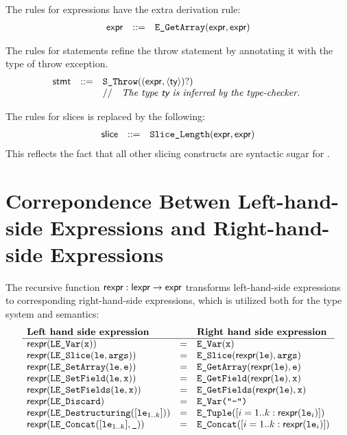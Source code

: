 \documentclass{book}
\begin{document}
The rules for expressions have the extra derivation rule:
\[
\begin{array}{rcl}
\textsf{expr} &::=& \texttt{E\_GetArray}(\textsf{expr}, \textsf{expr}) \\
\end{array}
\]

The rules for statements refine the throw statement by annotating it with
the type of throw exception.
\[
\begin{array}{rcl}
\textsf{stmt} &::=& \texttt{S\_Throw}((\textsf{expr}, \langle\textsf{ty}\rangle)?)\\
      & & //\quad\textit{The type $\textsf{ty}$ is inferred by the type-checker.}\ 
\end{array}
\]

The rules for slices is replaced by the following:
\[
\begin{array}{rcl}
\textsf{slice} &::=& \texttt{Slice\_Length}(\textsf{expr}, \textsf{expr}) \\
\end{array}
\]
This reflects the fact that all other slicing constructs are syntactic sugar
for \slicelength.

\chapter{Correpondence Betwen Left-hand-side Expressions and Right-hand-side Expressions
\label{ch:LeftToRight}}

The recursive function $\textsf{rexpr} : \textsf{lexpr} \rightarrow \textsf{expr}$ transforms
left-hand-side expressions to corresponding right-hand-side expressions,
which is utilized both for the type system and semantics:
\[
\begin{array}{lcl}
  \textbf{Left hand side expression} & & \textbf{Right hand side expression}\\
  \hline
  \textsf{rexpr}(\texttt{LE\_Var}(\texttt{x})) &=& \texttt{E\_Var}(\texttt{x})\\
  \textsf{rexpr}(\texttt{LE\_Slice}(\texttt{le}, \texttt{args})) &=& \texttt{E\_Slice}(\textsf{rexpr}(\texttt{le}), \texttt{args})\\
  \textsf{rexpr}(\texttt{LE\_SetArray}(\texttt{le}, \texttt{e})) &=& \texttt{E\_GetArray}(\textsf{rexpr}(\texttt{le}), \texttt{e})\\
  \textsf{rexpr}(\texttt{LE\_SetField}(\texttt{le}, \texttt{x})) &=& \texttt{E\_GetField}(\textsf{rexpr}(\texttt{le}), \texttt{x})\\
  \textsf{rexpr}(\texttt{LE\_SetFields}(\texttt{le}, \texttt{x})) &=& \texttt{E\_GetFields}(\textsf{rexpr}(\texttt{le}), \texttt{x})\\
  \textsf{rexpr}(\texttt{LE\_Discard}) &=& \texttt{E\_Var("-")}\\
  \textsf{rexpr}(\texttt{LE\_Destructuring}([\texttt{le}_{1..k}])) &=& \texttt{E\_Tuple}([i=1..k: \textsf{rexpr}(\texttt{le}_i)])\\
  \textsf{rexpr}(\texttt{LE\_Concat}([\texttt{le}_{1..k}], \texttt{\_})) &=& \texttt{E\_Concat}([i=1..k: \textsf{rexpr}(\texttt{le}_i)])\\
\end{array}
\]
\end{document}
